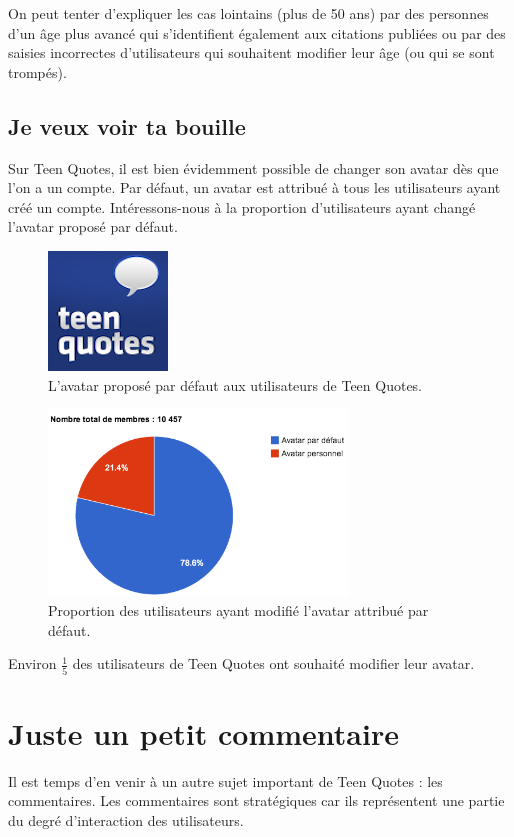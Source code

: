 \documentclass{report}
\begin{document}
	On peut tenter d'expliquer les cas lointains (plus de 50 ans) par des personnes d'un âge plus avancé qui s'identifient également aux citations publiées ou par des saisies incorrectes d'utilisateurs qui souhaitent modifier leur âge (ou qui se sont trompés).

	\section{Je veux voir ta bouille}
	Sur Teen Quotes, il est bien évidemment possible de changer son avatar dès que l'on a un compte. Par défaut, un avatar est attribué à tous les utilisateurs ayant créé un compte. Intéressons-nous à la proportion d'utilisateurs ayant changé l'avatar proposé par défaut.
	\begin{figure}[H]
		\center
		\includegraphics{images/avatarDefaut.png}
		\caption{L'avatar proposé par défaut aux utilisateurs de Teen Quotes.}
	\end{figure}

	\begin{figure}[H]
		\center
		\includegraphics[width=300px]{images/partAvatar.png}
		\caption{Proportion des utilisateurs ayant modifié l'avatar attribué par défaut.}
	\end{figure}
	Environ $\frac{1}{5}$ des utilisateurs de Teen Quotes ont souhaité modifier leur avatar.

	\chapter{Juste un petit commentaire}
	Il est temps d'en venir à un autre sujet important de Teen Quotes : les commentaires. Les commentaires sont stratégiques car ils représentent une partie du degré d'interaction des utilisateurs.
\end{document}
